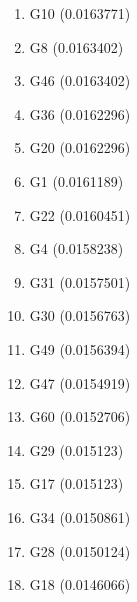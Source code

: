 \begin{enumerate}
\item G10 (0.0163771)
\item G8 (0.0163402)
\item G46 (0.0163402)
\item G36 (0.0162296)
\item G20 (0.0162296)
\item G1 (0.0161189)
\item G22 (0.0160451)
\item G4 (0.0158238)
\item G31 (0.0157501)
\item G30 (0.0156763)
\item G49 (0.0156394)
\item G47 (0.0154919)
\item G60 (0.0152706)
\item G29 (0.015123)
\item G17 (0.015123)
\item G34 (0.0150861)
\item G28 (0.0150124)
\item G18 (0.0146066)
\end{enumerate}